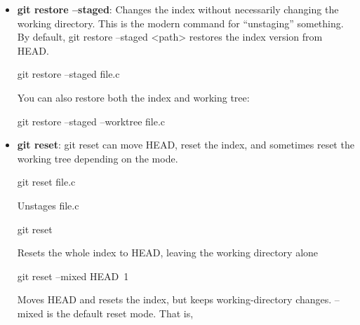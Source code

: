 \documentclass{report}
\begin{document}
\begin{itemize}
\begin{itemize}
                    This is roughly equivalent to
                    \bigbreak \noindent 
                    \begin{bashcode}
                        mv oldname.c newname.c
                        git rm oldname.c
                        git add newname.c
                    \end{bashcode}
                \item \textbf{git restore --staged}: Changes the index without necessarily changing the working directory. This is the modern command for “unstaging” something. By default, git restore --staged <path> restores the index version from HEAD.
                    \bigbreak \noindent 
                    \begin{bashcode}
                        git restore --staged file.c
                    \end{bashcode}
                    \bigbreak \noindent 
                    You can also restore both the index and working tree:
                    \bigbreak \noindent 
                    \begin{cppcode}
                        git restore --staged --worktree file.c
                    \end{cppcode}
                \item \textbf{git reset}: git reset can move HEAD, reset the index, and sometimes reset the working tree depending on the mode.
                    \bigbreak \noindent 
                    \begin{bashcode}
                        git reset file.c
                    \end{bashcode}
                    \bigbreak \noindent 
                    Unstages file.c
                    \bigbreak \noindent 
                    \begin{bashcode}
                        git reset 
                    \end{bashcode}
                    \bigbreak \noindent 
                    Resets the whole index to HEAD, leaving the working directory alone
                    \bigbreak \noindent 
                    \begin{bashcode}
                        git reset --mixed HEAD~1
                    \end{bashcode}
                    \bigbreak \noindent 
                    Moves HEAD and resets the index, but keeps working-directory changes. --mixed is the default reset mode. That is,
                    \begin{enumerate}

\end{enumerate}
\end{itemize}
\end{itemize}
\end{document}
